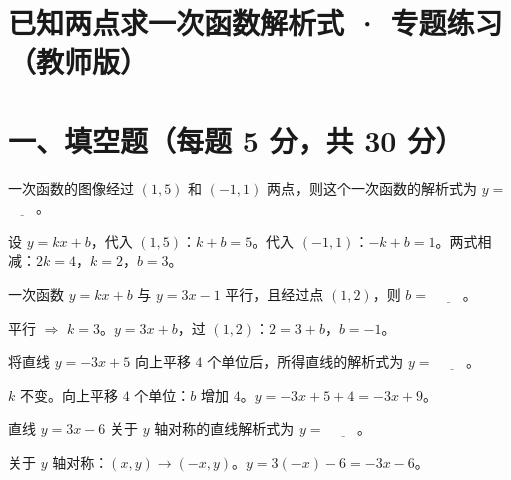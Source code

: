 \documentclass{exam-zh}
\begin{document}
\section*{已知两点求一次函数解析式 · 专题练习（教师版）}

\section*{一、填空题（每题 5 分，共 30 分）}


\begin{question}[points=5]
  一次函数的图像经过 $(1, 5)$ 和 $(-1, 1)$ 两点，则这个一次函数的解析式为 $y = $ $\underline{\quad\quad}$。
  \fillin
  \paren[$2x + 3$]
  \begin{solutionblock}
    设 $y = kx + b$，代入 $(1, 5)$：$k + b = 5$。代入 $(-1, 1)$：$-k + b = 1$。两式相减：$2k = 4$，$k = 2$，$b = 3$。
  \end{solutionblock}
\end{question}



\begin{question}[points=5]
  一次函数 $y = kx + b$ 与 $y = 3x - 1$ 平行，且经过点 $(1, 2)$，则 $b = $ $\underline{\quad\quad}$。
  \fillin
  \paren[$-1$]
  \begin{solutionblock}
    平行 $\Rightarrow$ $k = 3$。$y = 3x + b$，过 $(1, 2)$：$2 = 3 + b$，$b = -1$。
  \end{solutionblock}
\end{question}



\begin{question}[points=5]
  将直线 $y = -3x + 5$ 向上平移 $4$ 个单位后，所得直线的解析式为 $y = $ $\underline{\quad\quad}$。
  \fillin
  \paren[$-3x + 9$]
  \begin{solutionblock}
    $k$ 不变。向上平移 $4$ 个单位：$b$ 增加 $4$。$y = -3x + 5 + 4 = -3x + 9$。
  \end{solutionblock}
\end{question}



\begin{question}[points=5]
  直线 $y = 3x - 6$ 关于 $y$ 轴对称的直线解析式为 $y = $ $\underline{\quad\quad}$。
  \fillin
  \paren[$-3x - 6$]
  \begin{solutionblock}
    关于 $y$ 轴对称：$(x, y) \to (-x, y)$。$y = 3(-x) - 6 = -3x - 6$。
  \end{solutionblock}
\end{question}
\end{document}
